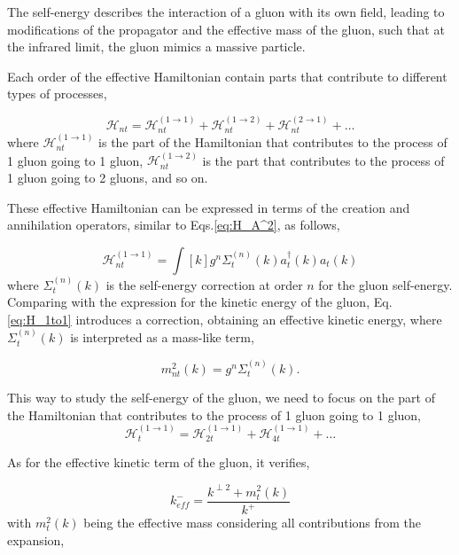 \documentclass[11pt,a4paper,twoside,pdf]{article}
\numberwithin{equation}{section}
\begin{document}
The self-energy describes the interaction of a gluon with its own field, leading to 
modifications of the propagator and the effective mass of the gluon, such that 
at the infrared limit, the gluon mimics a massive particle.

Each order of the effective Hamiltonian contain parts that contribute to different 
types of processes, 

\begin{equation}
    \mathcal{H}_{n t} = \mathcal{H}_{n t}^{(1 \rightarrow 1)} + \mathcal{H}_{n t}^{(1 \rightarrow 2)} + 
    \mathcal{H}_{n t}^{(2 \rightarrow 1)} + \ldots
\end{equation}
where $\mathcal{H}_{n t}^{(1 \rightarrow 1)}$ is the part of the Hamiltonian that
contributes to the process of 1 gluon going to 1 gluon, $\mathcal{H}_{n t}^{(1 \rightarrow 2)}$ 
is the part that contributes to the process of 1 gluon going to 2 gluons, and so on.

These effective Hamiltonian can be expressed in terms of the creation and annihilation operators,
similar to Eqs.\eqref{eq:H_A^2}, as follows,

\begin{equation}
    \mathcal{H}_{n t}^{(1 \rightarrow 1)} = \int [k] g^n \Sigma_t^{(n)} (k) 
    a^{\dagger}_t (k) a_t (k) 
    \label{eq:H_1to1}
\end{equation}
where $\Sigma_t^{(n)} (k)$ is the self-energy correction at order $n$ for the gluon
self-energy. Comparing with the expression for the kinetic energy of the gluon, Eq.
\eqref{eq:H_1to1} introduces a correction, obtaining an effective kinetic energy, where
$\Sigma_t^{(n)} (k)$ is interpreted as a mass-like term,

\begin{equation}
    m_{n t}^2 (k) = g^n \Sigma_t^{(n)} (k).
\end{equation}

This way to study the self-energy of the gluon, we need to focus on the part of the
Hamiltonian that contributes to the process of 1 gluon going to 1 gluon,
\begin{equation}
    \mathcal{H}_{t}^{(1 \rightarrow 1)} = \mathcal{H}_{2 t}^{(1 \rightarrow 1)} + 
    \mathcal{H}_{4 t}^{(1 \rightarrow 1)} + \ldots
\end{equation}

As for the effective kinetic term of the gluon, it verifies,

\begin{equation}
    k_{eff}^- = \frac{k^{\perp 2} + m_{t}^2 (k)}{k^+}
\end{equation}
with $m_{t}^2 (k)$ being the effective mass considering all contributions from the 
expansion,
\end{document}
